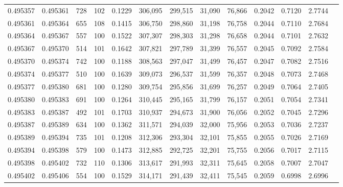 \begin{tabular}{rrrrrrrrrrrrr}
0.495357 & 0.495361 &   728 & 102 &                                     0.1229 & 306,095 & 299,515 &  31,090 &  76,866 & 0.2042 & 0.7120 & 2.7744 \\
0.495361 & 0.495364 &   655 & 108 &                                     0.1415 & 306,750 & 298,860 &  31,198 &  76,758 & 0.2044 & 0.7110 & 2.7684 \\
0.495364 & 0.495367 &   557 & 100 &                                     0.1522 & 307,307 & 298,303 &  31,298 &  76,658 & 0.2044 & 0.7101 & 2.7632 \\
0.495367 & 0.495370 &   514 & 101 &                                     0.1642 & 307,821 & 297,789 &  31,399 &  76,557 & 0.2045 & 0.7092 & 2.7584 \\
0.495370 & 0.495374 &   742 & 100 &                                     0.1188 & 308,563 & 297,047 &  31,499 &  76,457 & 0.2047 & 0.7082 & 2.7516 \\
0.495374 & 0.495377 &   510 & 100 &                                     0.1639 & 309,073 & 296,537 &  31,599 &  76,357 & 0.2048 & 0.7073 & 2.7468 \\
0.495377 & 0.495380 &   681 & 100 &                                     0.1280 & 309,754 & 295,856 &  31,699 &  76,257 & 0.2049 & 0.7064 & 2.7405 \\
0.495380 & 0.495383 &   691 & 100 &                                     0.1264 & 310,445 & 295,165 &  31,799 &  76,157 & 0.2051 & 0.7054 & 2.7341 \\
0.495383 & 0.495387 &   492 & 101 &                                     0.1703 & 310,937 & 294,673 &  31,900 &  76,056 & 0.2052 & 0.7045 & 2.7296 \\
0.495387 & 0.495389 &   634 & 100 &                                     0.1362 & 311,571 & 294,039 &  32,000 &  75,956 & 0.2053 & 0.7036 & 2.7237 \\
0.495389 & 0.495394 &   735 & 101 &                                     0.1208 & 312,306 & 293,304 &  32,101 &  75,855 & 0.2055 & 0.7026 & 2.7169 \\
0.495394 & 0.495398 &   579 & 100 &                                     0.1473 & 312,885 & 292,725 &  32,201 &  75,755 & 0.2056 & 0.7017 & 2.7115 \\
0.495398 & 0.495402 &   732 & 110 &                                     0.1306 & 313,617 & 291,993 &  32,311 &  75,645 & 0.2058 & 0.7007 & 2.7047 \\
0.495402 & 0.495406 &   554 & 100 &                                     0.1529 & 314,171 & 291,439 &  32,411 &  75,545 & 0.2059 & 0.6998 & 2.6996 \\

\end{tabular}
